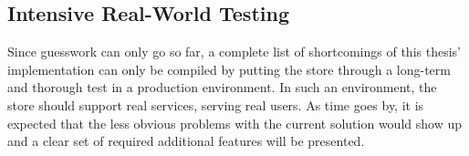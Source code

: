 \subsection{Intensive Real-World Testing}

Since guesswork can only go so far, a complete list of shortcomings of this thesis' implementation can only be compiled by putting the store through a long-term and thorough test in a production environment. In such an environment, the store should support real services, serving real users. As time goes by, it is expected that the less obvious problems with the current solution would show up and a clear set of required additional features will be presented.
